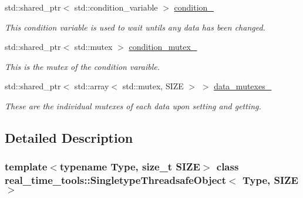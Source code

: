 \begin{DoxyCompactItemize}
\mbox{\label{classreal__time__tools_1_1SingletypeThreadsafeObject_a628a0eb20c8a683a95607468653c7b2e}} 
std\+::shared\+\_\+ptr$<$ std\+::condition\+\_\+variable $>$ \hyperlink{classreal__time__tools_1_1SingletypeThreadsafeObject_a628a0eb20c8a683a95607468653c7b2e}{condition\+\_\+}
\begin{DoxyCompactList}\small\item\em This condition variable is used to wait untils any data has been changed. \end{DoxyCompactList}\item 
\mbox{\label{classreal__time__tools_1_1SingletypeThreadsafeObject_aa0bbdbc03580868de0a04e5be234408d}} 
std\+::shared\+\_\+ptr$<$ std\+::mutex $>$ \hyperlink{classreal__time__tools_1_1SingletypeThreadsafeObject_aa0bbdbc03580868de0a04e5be234408d}{condition\+\_\+mutex\+\_\+}
\begin{DoxyCompactList}\small\item\em This is the mutex of the condition varaible. \end{DoxyCompactList}\item 
\mbox{\label{classreal__time__tools_1_1SingletypeThreadsafeObject_a55f7e015fa4915ea1c3af34757c2f671}} 
std\+::shared\+\_\+ptr$<$ std\+::array$<$ std\+::mutex, S\+I\+ZE $>$ $>$ \hyperlink{classreal__time__tools_1_1SingletypeThreadsafeObject_a55f7e015fa4915ea1c3af34757c2f671}{data\+\_\+mutexes\+\_\+}
\begin{DoxyCompactList}\small\item\em These are the individual mutexes of each data upon setting and getting. \end{DoxyCompactList}\end{DoxyCompactItemize}


\subsection{Detailed Description}
\subsubsection*{template$<$typename Type, size\+\_\+t S\+I\+ZE$>$\newline
class real\+\_\+time\+\_\+tools\+::\+Singletype\+Threadsafe\+Object$<$ Type, S\+I\+Z\+E $>$}


